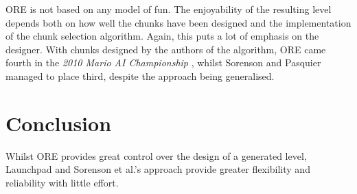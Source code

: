 \documentclass{scrartcl}
\begin{document}
ORE is not based on any model of fun. The enjoyability of the resulting level depends both on how well the chunks have been designed and the implementation of the chunk selection algorithm. Again, this puts a lot of emphasis on the designer. With chunks designed by the authors of the algorithm, ORE came fourth in the \textit{2010 Mario AI Championship} \cite{shaker:mario}, whilst Sorenson and Pasquier managed to place third, despite the approach being generalised.


\section{Conclusion}
Whilst ORE provides great control over the design of a generated level, Launchpad and Sorenson et al.'s approach provide greater flexibility and reliability with little effort. 




\end{document}
